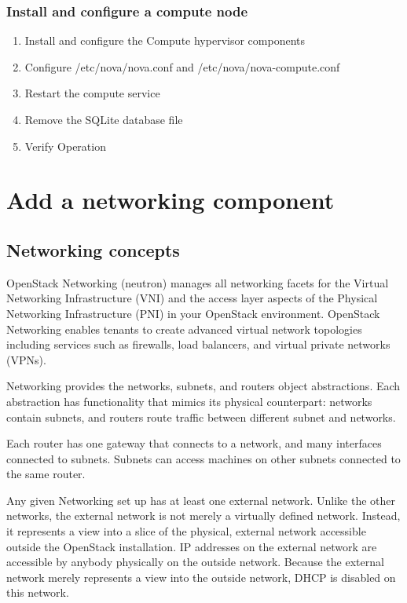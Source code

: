     \subsubsection{Install and configure a compute node}
        \begin{enumerate}
            \item Install and configure the Compute hypervisor components
            \item Configure /etc/nova/nova.conf and /etc/nova/nova-compute.conf
            \item Restart the compute service
            \item Remove the SQLite database file
            \item Verify Operation
        \end{enumerate}

\section{Add a networking component}
    \subsection{Networking concepts}

    \par OpenStack Networking (neutron) manages all networking facets for the Virtual Networking Infrastructure (VNI) and the access layer aspects of the Physical Networking Infrastructure (PNI) in your OpenStack environment. OpenStack Networking enables tenants to create advanced virtual network topologies including services such as firewalls, load balancers, and virtual private networks (VPNs).

    \par Networking provides the networks, subnets, and routers object abstractions. Each abstraction has functionality that mimics its physical counterpart: networks contain subnets, and routers route traffic between different subnet and networks.
    
    \par Each router has one gateway that connects to a network, and many interfaces connected to subnets. Subnets can access machines on other subnets connected to the same router.
    
    \par Any given Networking set up has at least one external network. Unlike the other networks, the external network is not merely a virtually defined network. Instead, it represents a view into a slice of the physical, external network accessible outside the OpenStack installation. IP addresses on the external network are accessible by anybody physically on the outside network. Because the external network merely represents a view into the outside network, DHCP is disabled on this network.
    
